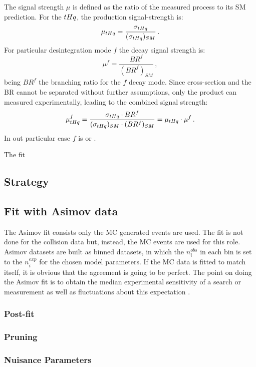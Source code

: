 The signal strength $\mu$ is defined as the ratio of the measured process
to its SM prediction. For the $tHq$, the production signal-strength is: 
\begin{equation*}
	\mu_{tHq} = \frac{\sigma_{tHq}}{(\sigma_{tHq})_{SM}} \, .
\end{equation*}
For particular desintegration mode $f$ the decay signal strength is:
\begin{equation*}
	\mu^{f} = \frac{BR^f}{(BR^f)_{SM}} \, , 
\end{equation*}
being $BR^f$ the branching ratio for the $f$ decay mode. %
Since cross-section and the BR cannot be separated without further assumptions, only the product
can measured experimentally, leading to the combined signal strength:
\begin{equation*}
	\mu_{tHq}^{f} = \frac{\sigma_{tHq}\cdot BR^f}{(\sigma_{tHq})_{SM} \cdot (BR^f)_{SM}} = \mu_{tHq} \cdot \mu^{f} \, .
\end{equation*}
In out particular case $f$ is \dilepOStau or \dilepSStau. 

The fit 


\subsection{Strategy}
\subsection{Fit with Asimov data}
The Asimov fit consists only the MC generated events are used. The fit is not done for the collision data but, 
instead, the MC events are used for this role. Asimov datasets are built as binned datasets, in which the $n_{i}^{obs}$
in each bin is set to the $n_{i}^{exp}$ for the chosen model parameters.
If the MC data is fitted to match itself, it is obvious that the agreement is going to be perfect. The point on doing the
Asimov fit is to obtain the median experimental sensitivity of a search or measurement as well as fluctuations about 
this expectation \cite{Cowan:2010js}. 
\subsubsection{Post-fit}
\subsubsection{Pruning}
\subsubsection{Nuisance Parameters}
